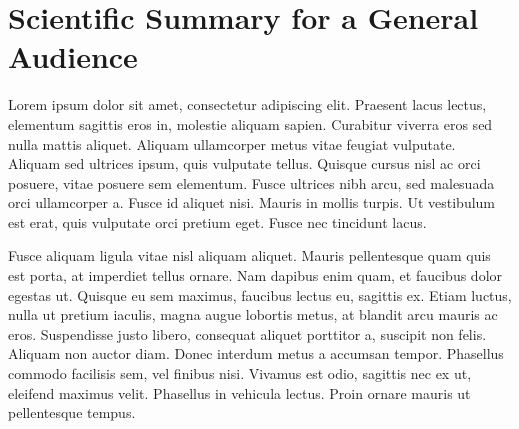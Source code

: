 \documentclass[10pt,twocolumn]{revtex4-2}    %
\begin{document}
\clearpage

\onecolumngrid %

\section*{Scientific Summary for a General Audience}



Lorem ipsum dolor sit amet, consectetur adipiscing elit. Praesent lacus lectus, elementum sagittis eros in, molestie aliquam sapien. Curabitur viverra eros sed nulla mattis aliquet. Aliquam ullamcorper metus vitae feugiat vulputate. Aliquam sed ultrices ipsum, quis vulputate tellus. Quisque cursus nisl ac orci posuere, vitae posuere sem elementum. Fusce ultrices nibh arcu, sed malesuada orci ullamcorper a. Fusce id aliquet nisi. Mauris in mollis turpis. Ut vestibulum est erat, quis vulputate orci pretium eget. Fusce nec tincidunt lacus.

Fusce aliquam ligula vitae nisl aliquam aliquet. Mauris pellentesque quam quis est porta, at imperdiet tellus ornare. Nam dapibus enim quam, et faucibus dolor egestas ut. Quisque eu sem maximus, faucibus lectus eu, sagittis ex. Etiam luctus, nulla ut pretium iaculis, magna augue lobortis metus, at blandit arcu mauris ac eros. Suspendisse justo libero, consequat aliquet porttitor a, suscipit non felis. Aliquam non auctor diam. Donec interdum metus a accumsan tempor. Phasellus commodo facilisis sem, vel finibus nisi. Vivamus est odio, sagittis nec ex ut, eleifend maximus velit. Phasellus in vehicula lectus. Proin ornare mauris ut pellentesque tempus.
\end{document}
